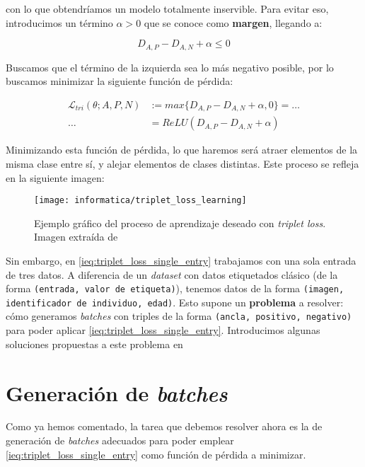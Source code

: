 con lo que obtendríamos un modelo totalmente inservible. Para evitar eso, introducimos un término $\alpha > 0$ que se conoce como \textbf{margen}, llegando a:

\begin{equation}
    D_{A, P} - D_{A, N} + \alpha \leq 0
\end{equation}

Buscamos que el término de la izquierda sea lo más negativo posible, por lo buscamos minimizar la siguiente función de pérdida:

\begin{equation} \label{ieq:triplet_loss_single_entry}
\begin{split}
    \mathcal{L}_{tri}(\theta; A, P, N) & := max \{D_{A, P} - D_{A, N} + \alpha, 0 \} = \ldots \\
    \ldots &= ReLU(D_{A, P} - D_{A, N} + \alpha)
\end{split}
\end{equation}

Minimizando esta función de pérdida, lo que haremos será atraer elementos de la misma clase entre sí, y alejar elementos de clases distintas. Este proceso se refleja en la siguiente imagen:

\begin{figure}[H]
    \centering
    \texttt{[image: informatica/triplet\_loss\_learning]}
    \caption{Ejemplo gráfico del proceso de aprendizaje deseado con \textit{triplet loss}. Imagen extraída de \cite{informatica:facenet}}
\end{figure}

Sin embargo, en \eqref{ieq:triplet_loss_single_entry} trabajamos con una sola entrada de tres datos. A diferencia de un \textit{dataset} con datos etiquetados clásico (de la forma \lstinline{(entrada, valor de etiqueta)}), tenemos datos de la forma \lstinline{(imagen, identificador de individuo, edad)}. Esto supone un \textbf{problema} a resolver: cómo generamos \textit{batches} con triples de la forma \lstinline{(ancla, positivo, negativo)} para poder aplicar \eqref{ieq:triplet_loss_single_entry}. Introducimos algunas soluciones propuestas a este problema en 

\section{Generación de \textit{batches}} \label{isec:batching}

Como ya hemos comentado, la tarea que debemos resolver ahora es la de generación de \textit{batches} adecuados para poder emplear \eqref{ieq:triplet_loss_single_entry} como función de pérdida a minimizar.

